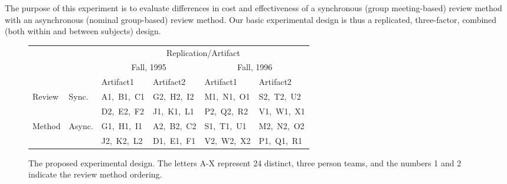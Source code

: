 The purpose of this experiment is to evaluate differences in cost and
effectiveness of a synchronous (group meeting-based) review method with an
asynchronous (nominal group-based) review method.  Our basic experimental
design is thus a replicated, three-factor, combined (both within and
between subjects) design.  




\begin{figure}[t]
\small
\begin{center}
\begin{tabular} {|p{0.60in}|p{0.50in}|p{1in}|p{1in}|p{1in}|p{1in}|} \cline{3-6}
\multicolumn{2}{c}{~}  & \multicolumn{4}{|c|}{Replication/Artifact} \\ \cline{3-6}
\multicolumn{2}{c|}{~} & \multicolumn{2}{|c|}{Fall, 1995}   & \multicolumn{2}{|c|}{Fall, 1996}    \\ \cline{3-6}
\multicolumn{2}{c|}{~} & Artifact1  & Artifact2  & Artifact1  & Artifact2  \\ \hline
Review        & Sync.  & A1,~B1,~C1 & G2,~H2,~I2 & M1,~N1,~O1 & S2,~T2,~U2 \\
              &        & D2,~E2,~F2 & J1,~K1,~L1 & P2,~Q2,~R2 & V1,~W1,~X1  \\ \cline{2-6}
Method        & Async. & G1,~H1,~I1 & A2,~B2,~C2 & S1,~T1,~U1 & M2,~N2,~O2  \\  
              &        & J2,~K2,~L2 & D1,~E1,~F1 & V2,~W2,~X2 & P1,~Q1,~R1  \\ \hline  
\end{tabular}
\end{center}
\normalsize
\caption{The proposed experimental design. The letters A-X represent
         24 distinct, three person teams, and the numbers 1 and 2 indicate the review
         method ordering.}
\label{fig:design}
\end{figure}

